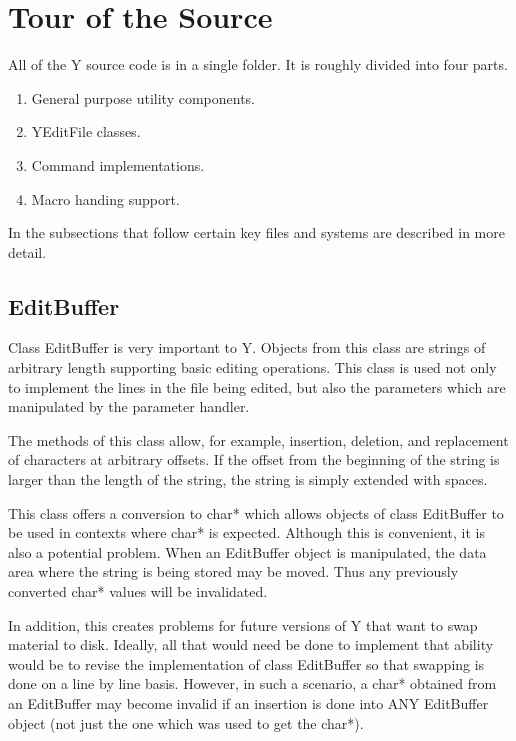 \section{Tour of the Source}

All of the Y source code is in a single folder. It is roughly divided into four parts.

\begin{enumerate}
\item General purpose utility components.
\item YEditFile classes.
\item Command implementations.
\item Macro handing support.
\end{enumerate}

In the subsections that follow certain key files and systems are described in more detail.

\subsection{EditBuffer}

Class EditBuffer is very important to Y. Objects from this class are strings of arbitrary length
supporting basic editing operations. This class is used not only to implement the lines in the
file being edited, but also the parameters which are manipulated by the parameter handler.

The methods of this class allow, for example, insertion, deletion, and replacement of characters
at arbitrary offsets. If the offset from the beginning of the string is larger than the length
of the string, the string is simply extended with spaces.

This class offers a conversion to char* which allows objects of class EditBuffer to be used in
contexts where char* is expected. Although this is convenient, it is also a potential problem.
When an EditBuffer object is manipulated, the data area where the string is being stored may
be moved. Thus any previously converted char* values will be invalidated.

In addition, this creates problems for future versions of Y that want to swap material to disk.
Ideally, all that would need be done to implement that ability would be to revise the
implementation of class EditBuffer so that swapping is done on a line by line basis. However, in
such a scenario, a char* obtained from an EditBuffer may become invalid if an insertion is done
into ANY EditBuffer object (not just the one which was used to get the char*).

